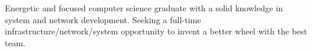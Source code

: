 Energetic and focused computer science graduate with a solid knowledge in system and network development. Seeking a full-time infrastructure/network/system opportunity to invent a better wheel with the best team.